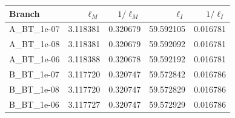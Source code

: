 \begin{tabular}{lrrrr}
\hline\hline
Branch & $\ell_{M}$ & $1/\ell_M$ & $\ell_I$ & $1/\ell_I$ \\
\hline
A\_BT\_1e-07 & 3.118381 & 0.320679 & 59.592105 & 0.016781 \\
A\_BT\_1e-08 & 3.118381 & 0.320679 & 59.592092 & 0.016781 \\
A\_BT\_1e-06 & 3.118388 & 0.320678 & 59.592192 & 0.016781 \\
B\_BT\_1e-07 & 3.117720 & 0.320747 & 59.572842 & 0.016786 \\
B\_BT\_1e-08 & 3.117720 & 0.320747 & 59.572829 & 0.016786 \\
B\_BT\_1e-06 & 3.117727 & 0.320747 & 59.572929 & 0.016786 \\
\hline\hline
\end{tabular}
